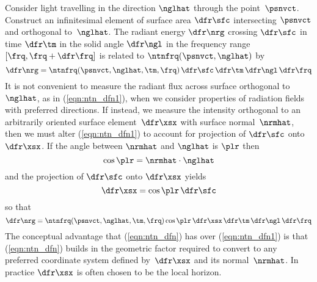 \documentclass[12pt]{article}
\begin{document}
Consider light travelling in the direction $\nglhat$ through
the point~$\psnvct$.
Construct an infinitesimal element of surface area $\dfr\sfc$
intersecting $\psnvct$ and orthogonal to~$\nglhat$.
The radiant energy $\dfr\nrg$ crossing $\dfr\sfc$ in time
$\dfr\tm$ in the solid angle $\dfr\ngl$ in the frequency range $[\frq,
\frq+\dfr\frq]$ is related to $\ntnfrq(\psnvct,\nglhat)$ by
\begin{equation}
\dfr\nrg = \ntnfrq(\psnvct,\nglhat,\tm,\frq) \,\dfr\sfc \,\dfr\tm \,\dfr\ngl \,\dfr\frq
\label{eqn:ntn_dfn1}
\end{equation}
It is not convenient to measure the radiant flux across surface
orthogonal to $\nglhat$, as in (\ref{eqn:ntn_dfn1}), when we consider
properties of radiation fields with preferred directions.
If instead, we measure the intensity orthogonal to an arbitrarily
oriented surface element~$\dfr\xsx$ with surface normal~$\nrmhat$, 
then we must alter (\ref{eqn:ntn_dfn1}) to account for projection
of $\dfr\sfc$ onto~$\dfr\xsx$.
If the angle between $\nrmhat$ and $\nglhat$ is $\plr$ then
\begin{equation}
\cos \plr = \nrmhat \cdot \nglhat
\label{eqn:plr_dfn}
\end{equation}
and the projection of $\dfr\sfc$ onto $\dfr\xsx$ yields
\begin{equation}
\dfr\xsx = \cos \plr \,\dfr\sfc
\label{eqn:dxsx_dfn}
\end{equation}
so that
\begin{equation}
\dfr\nrg = \ntnfrq(\psnvct,\nglhat,\tm,\frq) 
\cos \plr \,\dfr\xsx \,\dfr\tm \,\dfr\ngl \,\dfr\frq
\label{eqn:ntn_dfn}
\end{equation}
The conceptual advantage that (\ref{eqn:ntn_dfn}) has over
(\ref{eqn:ntn_dfn1}) is that (\ref{eqn:ntn_dfn}) builds in the 
geometric factor required to convert to any preferred coordinate
system defined by~$\dfr\xsx$ and its normal~$\nrmhat$.
In practice $\dfr\xsx$ is often chosen to be the local horizon.
\end{document}
